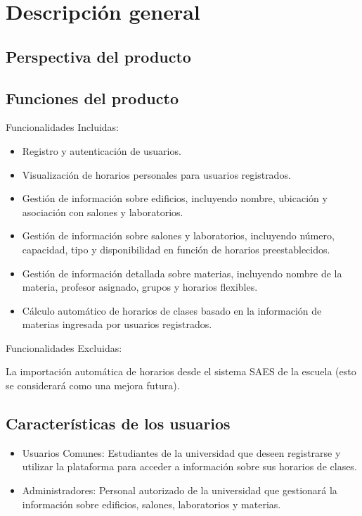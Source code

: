 \section{Descripción general}
\subsection{Perspectiva del producto}

\subsection{Funciones del producto}
Funcionalidades Incluidas:

\begin{itemize}
        \item Registro y autenticación de usuarios.
        \item Visualización de horarios personales para usuarios registrados.
        \item Gestión de información sobre edificios, incluyendo nombre, ubicación y asociación con salones y laboratorios.

        \item Gestión de información sobre salones y laboratorios, incluyendo número, capacidad, tipo y disponibilidad en función de horarios preestablecidos.

        \item Gestión de información detallada sobre materias, incluyendo nombre de la materia, profesor asignado, grupos y horarios flexibles.

        \item Cálculo automático de horarios de clases basado en la información de materias ingresada por usuarios registrados.
\end{itemize}


Funcionalidades Excluidas:

La importación automática de horarios desde el sistema SAES de la escuela (esto se considerará como una mejora futura).


\subsection{Características de los usuarios}
\begin{itemize}
        \item Usuarios Comunes: Estudiantes de la universidad que deseen registrarse y utilizar la plataforma para acceder a información sobre sus horarios de clases.
        \item Administradores: Personal autorizado de la universidad que gestionará la información sobre edificios, salones, laboratorios y materias.
\end{itemize}


